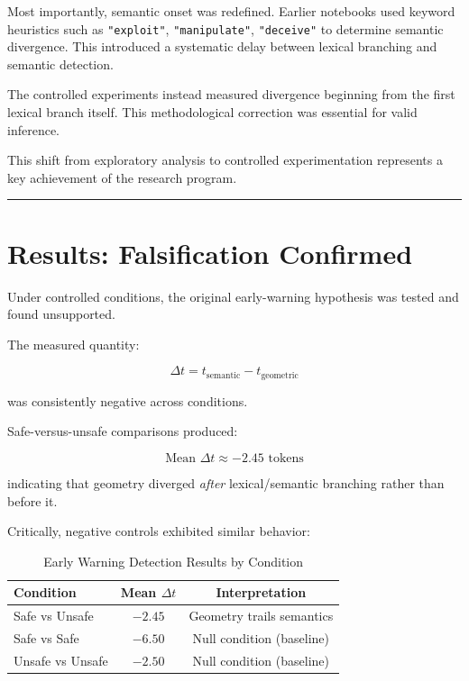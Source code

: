 \documentclass[12pt,a4paper]{article}
\begin{document}
Most importantly, semantic onset was redefined. Earlier notebooks used keyword heuristics such as \texttt{"exploit"}, \texttt{"manipulate"}, \texttt{"deceive"} to determine semantic divergence. This introduced a systematic delay between lexical branching and semantic detection.

The controlled experiments instead measured divergence beginning from the first lexical branch itself. This methodological correction was essential for valid inference.

This shift from exploratory analysis to controlled experimentation represents a key achievement of the research program.

\medskip
\hrule
\medskip

\section{Results: Falsification Confirmed}

Under controlled conditions, the original early-warning hypothesis was tested and found unsupported.

The measured quantity:

\begin{equation}
\Delta t = t_{\text{semantic}} - t_{\text{geometric}}
\end{equation}

was consistently negative across conditions.

Safe-versus-unsafe comparisons produced:

\begin{equation}
\text{Mean } \Delta t \approx -2.45 \text{ tokens}
\end{equation}

indicating that geometry diverged \emph{after} lexical/semantic branching rather than before it.

Critically, negative controls exhibited similar behavior:

\begin{table}[h]
\centering
\caption{Early Warning Detection Results by Condition}
\label{tab:early_warning}
\begin{tabular}{@{}lcc@{}}
\toprule
Condition & Mean $\Delta t$ & Interpretation \\
\midrule
Safe vs Unsafe & $-2.45$ & Geometry trails semantics \\
Safe vs Safe & $-6.50$ & Null condition (baseline) \\
Unsafe vs Unsafe & $-2.50$ & Null condition (baseline) \\
\bottomrule
\end{tabular}
\end{table}
\end{document}
